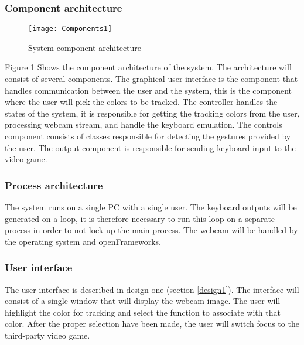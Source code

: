 \subsubsection{Component architecture}

\begin{figure}[!htb]
\centering
\texttt{[image: Components1]}
\caption{System component architecture}
\label{fig:components}
\end{figure}

Figure \ref{fig:components} Shows the component architecture of the system.
The architecture will consist of several components. The graphical user interface is the component that handles communication between the user and the system, this is the component where the user will pick the colors to be tracked. The controller handles the states of the system, it is responsible for getting the tracking colors from the user, processing webcam stream, and handle the keyboard emulation. The controls component consists of classes responsible for detecting the gestures provided by the user. The output component is responsible for sending keyboard input to the video game.

\subsubsection*{Process architecture}
The system runs on a single PC with a single user. The keyboard outputs will be generated on a loop, it is therefore necessary to run this loop on a separate process in order to not lock up the main process. The webcam will be handled by the operating system and openFrameworks.

\subsubsection{User interface}
The user interface is described in design one (section \ref{design1}). 
The interface will consist of a single window that will display the webcam image. 
The user will highlight the color for tracking and select the function to associate with that color. 
After the proper selection have been made, the user will switch focus to the third-party video game.
